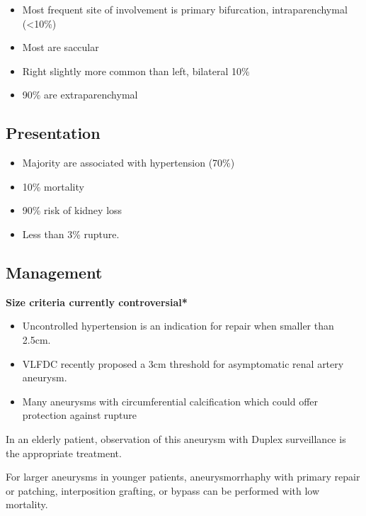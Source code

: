 \documentclass[
]{book}
\begin{document}
\begin{itemize}
\item
  Most frequent site of involvement is primary bifurcation,
  intraparenchymal (\textless10\%)
\item
  Most are saccular
\item
  Right slightly more common than left, bilateral 10\%
\item
  90\% are extraparenchymal
\end{itemize}

\hypertarget{presentation-2}{%
\subsection{Presentation}\label{presentation-2}}

\begin{itemize}
\item
  Majority are associated with hypertension (70\%)
  \citep{colemanRenalArteryAneurysms2015}
\item
  10\% mortality
\item
  90\% risk of kidney loss
\item
  Less than 3\% rupture.
\end{itemize}

\hypertarget{management-6}{%
\subsection{Management}\label{management-6}}

\textbf{Size criteria currently controversial*}

\begin{itemize}
\item
  Uncontrolled hypertension is an indication for repair when smaller
  than 2.5cm. \citep{colemanRenalArteryAneurysms2015}
\item
  VLFDC recently proposed a 3cm threshold for asymptomatic renal
  artery aneurysm. \citep{klausnerContemporaryManagementRenal2015}
\item
  Many aneurysms with circumferential calcification which could offer
  protection against rupture
\end{itemize}

In an elderly patient, observation of this aneurysm with Duplex
surveillance is the appropriate treatment.

For larger aneurysms in younger patients, aneurysmorrhaphy with primary
repair or patching, interposition grafting, or bypass can be performed
with low mortality. \citep{colemanRenalArteryAneurysms2015}
\end{document}
